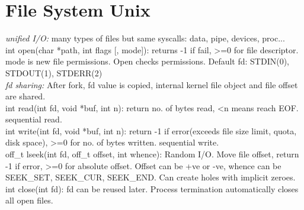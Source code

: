 \section{File System Unix}
\emph{unified I/O:} many types of files but same syscalls: data, pipe, devices, proc...\\
int open(char *path, int flags [, mode]): returns -1 if fail, >=0 for file descriptor. mode is new file permissions. Open checks permissions. Default fd: STDIN(0), STDOUT(1), STDERR(2)\\
\emph{fd sharing:} After fork, fd value is copied, internal kernel file object and file offset are shared.\\
int read(int fd, void *buf, int n): return no. of bytes read, <n means reach EOF. sequential read.\\
int write(int fd, void *buf, int n): return -1 if error(exceeds file size limit, quota, disk space), >=0 for no. of bytes written. sequential write.\\
off\_t lseek(int fd, off\_t offset, int whence): Random I/O. Move file offset, return -1 if error, >=0 for absolute offset. Offset can be +ve or -ve, whence can be SEEK\_SET, SEEK\_CUR, SEEK\_END. Can create holes with implicit zeroes.\\
int close(int fd): fd can be reused later. Process termination automatically closes all open files.